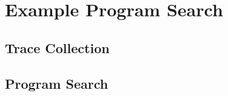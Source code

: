 \section{Example Program Search}\label{sec:search}

\todo

\subsection{Trace Collection}\label{sec:view}

\todo

\subsection{Program Search}\label{sec:view}

\todo
